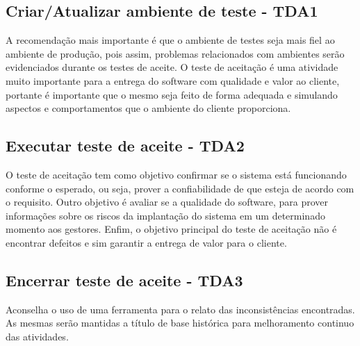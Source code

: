 \subsection{Criar/Atualizar ambiente de teste - TDA1}
\label{sec:guiatda1}

A recomendação mais importante é que o ambiente de testes seja mais fiel ao ambiente de produção, pois assim, problemas relacionados com ambientes serão evidenciados durante os testes de aceite. O teste de aceitação é uma atividade muito importante para a entrega do software com qualidade e valor ao cliente, portante é importante que o mesmo seja feito de forma adequada e simulando aspectos e comportamentos que o ambiente do cliente proporciona.

\subsection{Executar teste de aceite - TDA2}
\label{sec:guiatda2}

O teste de aceitação tem como objetivo confirmar se o sistema está funcionando conforme o esperado, ou seja, prover a confiabilidade de que esteja de acordo com o requisito. Outro objetivo é avaliar se a qualidade do software, para prover informações sobre os riscos da implantação do sistema em um determinado momento aos gestores. Enfim, o objetivo principal do teste de aceitação não é encontrar defeitos e sim garantir a entrega de valor para o cliente.

\subsection{Encerrar teste de aceite - TDA3}
\label{sec:guiatda3}

Aconselha o uso de uma ferramenta para o relato das inconsistências encontradas. As mesmas serão mantidas a título de base histórica para melhoramento continuo das atividades.


